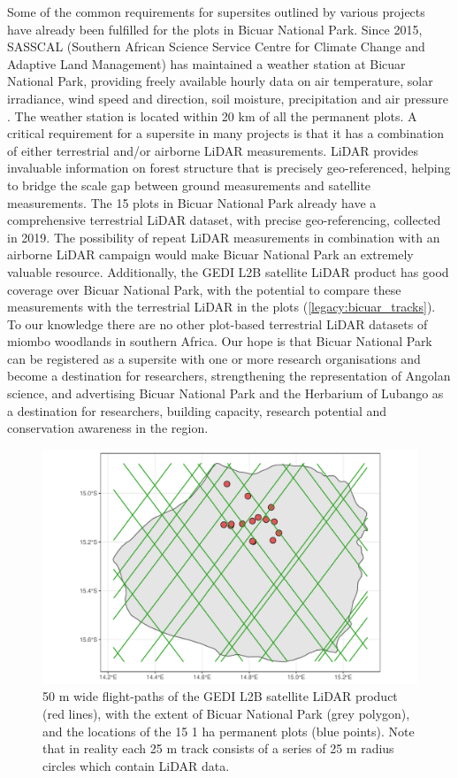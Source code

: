 \begin{refsection}
Some of the common requirements for supersites outlined by various projects have already been fulfilled for the plots in Bicuar National Park. Since 2015, SASSCAL (Southern African Science Service Centre for Climate Change and Adaptive Land Management) has maintained a weather station at Bicuar National Park, providing freely available hourly data on air temperature, solar irradiance, wind speed and direction, soil moisture, precipitation and air pressure \citep{SASSCAL_weather}. The weather station is located within 20 km of all the permanent plots. A critical requirement for a supersite in many projects is that it has a combination of either terrestrial and/or airborne LiDAR measurements. LiDAR provides invaluable information on forest structure that is precisely geo-referenced, helping to bridge the scale gap between ground measurements and satellite measurements. The 15 plots in Bicuar National Park already have a comprehensive terrestrial LiDAR dataset, with precise geo-referencing, collected in 2019. The possibility of repeat LiDAR measurements in combination with an airborne LiDAR campaign would make Bicuar National Park an extremely valuable resource. Additionally, the GEDI L2B satellite LiDAR product has good coverage over Bicuar National Park, with the potential to compare these measurements with the terrestrial LiDAR in the plots (\autoref{legacy:bicuar_tracks}). To our knowledge there are no other plot-based terrestrial LiDAR datasets of miombo woodlands in southern Africa. Our hope is that Bicuar National Park can be registered as a supersite with one or more research organisations and become a destination for researchers, strengthening the representation of Angolan science, and advertising Bicuar National Park and the Herbarium of Lubango as a destination for researchers, building capacity, research potential and conservation awareness in the region.

\begin{figure}
	\includegraphics[width=\linewidth]{img/bicuar_tracks}
	\caption[GEDI satellite LiDAR tracks over Bicuar National Park]{50 m wide flight-paths of the GEDI L2B satellite LiDAR product (red lines), with the extent of Bicuar National Park (grey polygon), and the locations of the 15 1 ha permanent plots (blue points). Note that in reality each 25 m track consists of a series of 25 m radius circles which contain LiDAR data.}
	\label{legacy:bicuar_tracks}
\end{figure}


\end{refsection}
